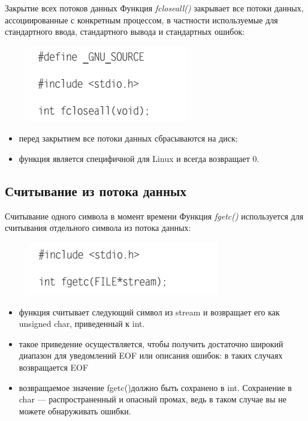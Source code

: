 \documentclass{beamer}
\begin{document}
\begin{frame}{Закрытие всех потоков данных}
Функция \textit{fcloseall()} закрывает все потоки данных, ассоциированные с конкретным процессом, в частности используемые для стандартного ввода, стандартного вывода и стандартных ошибок:
\begin{figure}[h]
\centering
\includegraphics[scale=0.5]{images/lec05-pic09.png}
\end{figure}
\begin{itemize}
\item перед закрытием все потоки данных сбрасываются на диск;
\item функция является специфичной для Linux и всегда возвращает 0.
\end{itemize}
\end{frame}

\subsection{Считывание из потока данных}

\begin{frame}{Считывание одного символа в момент времени}
Функция \textit{fgetc()} используется для считывания отдельного символа из потока данных:
\begin{figure}[h]
\centering
\includegraphics[scale=0.5]{images/lec05-pic10.png}
\end{figure}
\begin{itemize}
\item функция считывает следующий символ из stream и возвращает его как unsigned char, приведенный к int. 
\item такое приведение осуществляется, чтобы получить достаточно широкий диапазон для уведомлений EOF или описания ошибок: в таких случаях возвращается EOF
\item возвращаемое значение fgetc()должно быть сохранено в int. Сохранение в char — распространенный и опасный промах, ведь в таком случае вы не можете обнаруживать ошибки.
\end{itemize}
\end{frame}
\end{document}
